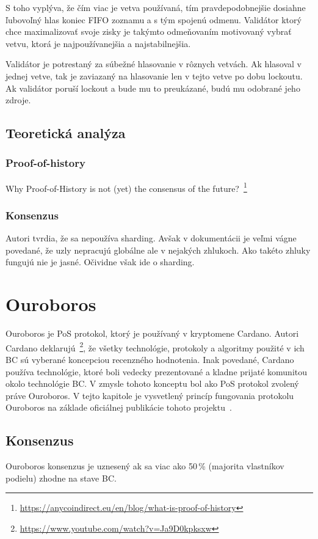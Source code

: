 S toho vyplýva, že čím viac je vetva používaná, tím pravdepodobnejšie dosiahne ľubovoľný hlas koniec FIFO zoznamu a s tým spojenú odmenu. Validátor ktorý chce maximalizovať svoje zisky je takýmto odmeňovaním motivovaný vybrať vetvu, ktorá je najpoužívanejšia a najstabilnejšia.

Validátor je potrestaný za súbežné hlasovanie v rôznych vetvách. Ak hlasoval v jednej vetve, tak je zaviazaný na hlasovanie len v tejto vetve po dobu lockoutu. Ak validátor poruší lockout a bude mu to preukázané, budú mu odobrané jeho zdroje.

\section{Teoretická analýza}\label{sec:solana-teor}

\subsection{Proof-of-history}

Why Proof-of-History is not (yet) the consensus of the future?~\footnote{\url{https://anycoindirect.eu/en/blog/what-is-proof-of-history}}

\subsection{Konsenzus}
Autori tvrdia, že sa nepoužíva sharding. Avšak v dokumentácii je veľmi vágne povedané, že uzly nepracujú globálne ale v nejakých zhlukoch. Ako takéto zhluky fungujú nie je jasné. Očividne však ide o sharding.

\chapter{Ouroboros}

Ouroboros je PoS protokol, ktorý je používaný v kryptomene Cardano. Autori Cardano deklarujú~\footnote{\url{https://www.youtube.com/watch?v=Ja9D0kpksxw}}, že všetky technológie, protokoly a algoritmy použité v ich BC sú vyberané koncepciou recenzného hodnotenia. Inak povedané, Cardano používa technológie, ktoré boli vedecky prezentované a kladne prijaté komunitou okolo technológie BC. V zmysle tohoto konceptu bol ako PoS protokol zvolený práve Ouroboros. V tejto kapitole je vysvetlený princíp fungovania protokolu Ouroboros na základe oficiálnej publikácie tohoto projektu~\cite{ouroborosWp}.

\section{Konsenzus}
Ouroboros konsenzus je uznesený ak sa viac ako 50\,\% (majorita vlastníkov podielu) zhodne na stave BC.

